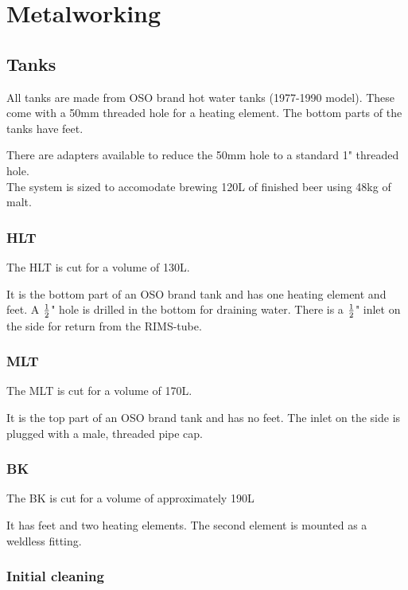 \documentclass[11pt,fleqn,openany]{book} %
\begin{document}

\chapter{Metalworking}

\section{Tanks}

All tanks are made from OSO brand hot water tanks (1977-1990 model). These come with a 50mm threaded hole for a heating element. The bottom parts of the tanks have feet.

There are adapters available to reduce the 50mm hole to a standard 1" threaded hole.\\

The system is sized to accomodate brewing 120L of finished beer using 48kg of malt.

\subsection{HLT}

The HLT is cut for a volume of 130L.

It is the bottom part of an OSO brand tank and has one heating element and feet. A $1 \over 2$" hole is drilled in the bottom for draining water.  There is a $1 \over 2$" inlet on the side for return from the RIMS-tube.

\subsection{MLT}

The MLT is cut for a volume of 170L. 

It is the top part of an OSO brand tank and has no feet. The inlet on the side is plugged with a male, threaded pipe cap.

\subsection{BK}

The BK is cut for a volume of approximately 190L

It has feet and two heating elements. The second element is mounted as a weldless fitting.

\subsection{Initial cleaning}
\end{document}
